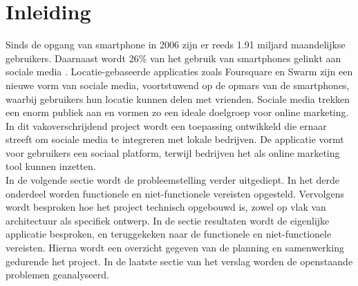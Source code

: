 \chapter{Inleiding}

Sinds de opgang van smartphone in 2006 zijn er reeds 1.91 miljard maandelijkse gebruikers. Daarnaast wordt 26\% van het gebruik van smartphones gelinkt aan sociale media \cite{smartphone_sales}. Locatie-gebaseerde applicaties zoals Foursquare\cite{foursquare} en Swarm\cite{swarm} zijn een nieuwe vorm van sociale media, voortstuwend op de opmars van de smartphones, waarbij gebruikers hun locatie kunnen delen met vrienden.
Sociale media trekken een enorm publiek aan en vormen zo een ideale doelgroep voor online marketing.\\

In dit vakoverschrijdend project wordt een toepassing ontwikkeld die ernaar streeft om sociale media te integreren met lokale bedrijven.
De applicatie vormt voor gebruikers een sociaal platform, terwijl bedrijven het als online marketing tool kunnen inzetten.\\

In de volgende sectie wordt de probleemstelling verder uitgediept. In het derde onderdeel worden functionele en niet-functionele vereisten opgesteld. Vervolgens wordt besproken hoe het project technisch opgebouwd is, zowel op vlak van architectuur als specifiek ontwerp. In de sectie resultaten wordt de eigenlijke applicatie besproken, en teruggekeken naar de functionele en niet-functionele vereisten. Hierna wordt een overzicht gegeven van de planning en samenwerking gedurende het project. In de laatste sectie van het verslag worden de openstaande problemen geanalyseerd.